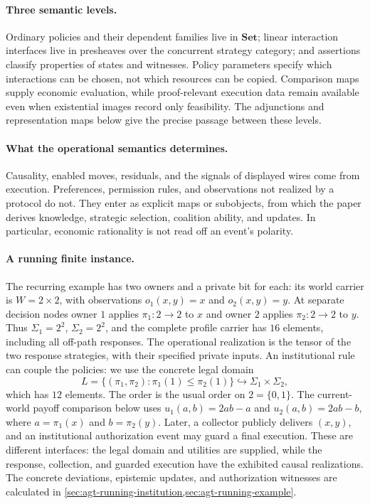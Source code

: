 \documentclass[11pt,a4paper]{article}
\numberwithin{equation}{section}
\theoremstyle{definition}
\theoremstyle{remark}
\theoremstyle{plain}
\begin{document}
\paragraph{Three semantic levels.}
Ordinary policies and their dependent families live in $\mathbf{Set}$;
linear interaction interfaces live in presheaves over the concurrent
strategy category; and assertions classify properties of states and
witnesses. Policy parameters specify which interactions can be chosen, not
which resources can be copied. Comparison maps supply economic evaluation,
while proof-relevant execution data remain available even when existential
images record only feasibility. The adjunctions and representation maps
below give the precise passage between these levels.

\paragraph{What the operational semantics determines.}
Causality, enabled moves, residuals, and the signals of displayed wires
come from execution. Preferences, permission rules, and observations not
realized by a protocol do not. They enter as explicit maps or subobjects,
from which the paper derives knowledge, strategic selection, coalition
ability, and updates. In particular, economic rationality is not read off
an event's polarity.

\paragraph{A running finite instance.}
The recurring example has two owners and a private bit for each: its world
carrier is $W=2\times2$, with observations $o_1(x,y)=x$ and
$o_2(x,y)=y$. At separate decision nodes owner $1$ applies
$\pi_1:2\to2$ to $x$ and owner $2$ applies $\pi_2:2\to2$ to $y$.
Thus $\Sigma_1=2^2$, $\Sigma_2=2^2$, and the complete profile carrier
has $16$ elements, including all off-path responses. The operational
realization is the tensor of the two response strategies, with their
specified private inputs. An institutional rule can couple the policies:
we use the concrete legal domain
\[
 L=\{(\pi_1,\pi_2):\pi_1(1)\leq\pi_2(1)\}\hookrightarrow
 \Sigma_1\times\Sigma_2,
\]
which has $12$ elements. The order is the usual order on $2=\{0,1\}$.
The current-world payoff comparison below uses
$u_1(a,b)=2ab-a$ and $u_2(a,b)=2ab-b$, where
$a=\pi_1(x)$ and $b=\pi_2(y)$. Later, a collector publicly delivers
$(x,y)$, and an institutional authorization event may guard a final
execution. These are different interfaces: the legal domain and utilities
are supplied, while the response, collection, and guarded execution have
the exhibited causal realizations. The concrete deviations, epistemic
updates, and authorization witnesses are calculated in
\cref{sec:agt-running-institution,sec:agt-running-example}.
\end{document}
